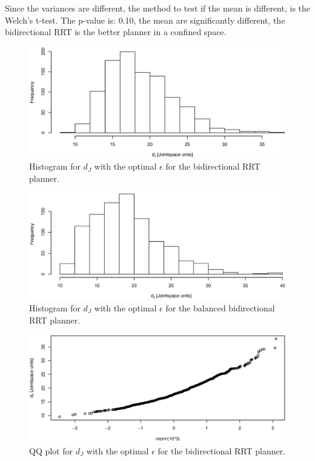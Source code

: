 Since the variances are different, the method to test if the mean is different, is the Welch's t-test.
The p-value is:  0.10, the mean are significantly different, the bidirectional RRT is the better planner in a confined space.

\begin{figure}[h]
 \centering
 \includegraphics[width=\figsize]{graphics/hist_op_bi}
 \caption{Histogram for \(d_J\) with the optimal \(\epsilon\) for the bidirectional RRT planner.}
 \label{fig:balanced_correlated}
\end{figure}

\begin{figure}[h]
 \centering
 \includegraphics[width=\figsize]{graphics/hist_op_ba}
 \caption{Histogram for \(d_J\) with the optimal \(\epsilon\) for the balanced bidirectional RRT planner.}
 \label{fig:balanced_correlated}
\end{figure}

\begin{figure}[h]
 \centering
 \includegraphics[width=\figsize]{graphics/qq_op_bi}
 \caption{QQ plot for \(d_J\) with the optimal \(\epsilon\) for the bidirectional RRT planner.}
 \label{fig:balanced_correlated}
\end{figure}

